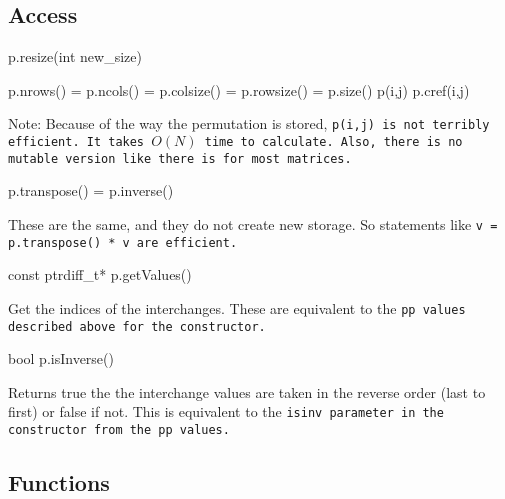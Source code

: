 \subsection{Access}
\label{Permutation_Access}

\begin{tmvcode}
p.resize(int new_size)
\end{tmvcode}

\begin{tmvcode}
p.nrows() = p.ncols() = p.colsize() = p.rowsize() = p.size()
p(i,j)
p.cref(i,j)
\end{tmvcode}
Note: Because of the way the permutation is stored, \tt{p(i,j)} is not
terribly efficient.  It takes $O(N)$ time to calculate.  Also, there is no
mutable version like there is for most matrices.

\begin{tmvcode}
p.transpose() = p.inverse()
\end{tmvcode}
These are the same, and they do not create new storage.  So statements like
\tt{v = p.transpose() * v} are efficient.

\begin{tmvcode}
const ptrdiff_t* p.getValues()
\end{tmvcode}
Get the indices of the interchanges.  These are equivalent to the \tt{pp} values
described above for the constructor.

\begin{tmvcode}
bool p.isInverse()
\end{tmvcode}
Returns true the the interchange values are taken in the reverse order (last to first)
or false if not.  This is equivalent to the \tt{isinv} parameter in the constructor from the \tt{pp} values.

\vspace{12pt} %

\subsection{Functions}
\label{Permutation_Functions}

